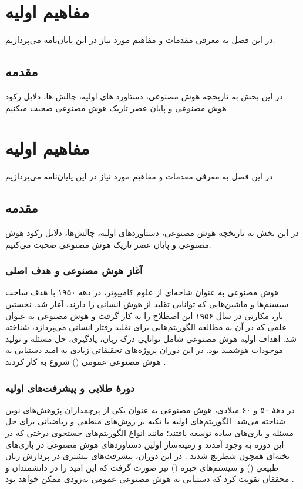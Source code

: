 \chapter{مفاهیم اولیه}
در این فصل به معرفی مقدمات و مفاهیم مورد نیاز در این پایان‌نامه می‌پردازیم. 
\section{مقدمه}
در این بخش به تاریخچه هوش مصنوعی، دستاورد های اولیه، چالش ها، دلایل رکود هوش مصنوعی و پایان عصر تاریک هوش مصنوعی صحبت میکنیم 



\chapter{مفاهیم اولیه}

در این فصل به معرفی مقدمات و مفاهیم مورد نیاز در این پایان‌نامه می‌پردازیم.

\section{مقدمه}

در این بخش به تاریخچه هوش مصنوعی، دستاوردهای اولیه، چالش‌ها، دلایل رکود هوش مصنوعی و پایان عصر تاریک هوش مصنوعی صحبت می‌کنیم.

\subsection{آغاز هوش مصنوعی و هدف اصلی}

هوش مصنوعی به عنوان شاخه‌ای از علوم کامپیوتر، در دهه ۱۹۵۰ با هدف ساخت سیستم‌ها و ماشین‌هایی که توانایی تقلید از هوش انسانی را دارند، آغاز شد. نخستین بار، مکارتی در سال ۱۹۵۶ این اصطلاح را به کار گرفت \cite{mccarthy1956proposal} و هوش مصنوعی به عنوان علمی که در آن به مطالعه الگوریتم‌هایی برای تقلید رفتار انسانی می‌پردازد، شناخته شد. اهداف اولیه هوش مصنوعی شامل توانایی درک زبان، یادگیری، حل مسئله و تولید موجودات هوشمند بود. در این دوران پروژه‌های تحقیقاتی زیادی به امید دستیابی به هوش مصنوعی عمومی 
()
شروع به کار کردند \cite{crevier1993ai,nilsson2010quest}.

\subsection{دورهٔ طلایی و پیشرفت‌های اولیه}

در دههٔ ۵۰ و ۶۰ میلادی، هوش مصنوعی به عنوان یکی از پرچمداران پژوهش‌های نوین شناخته می‌شد. الگوریتم‌های اولیه با تکیه بر روش‌های منطقی و ریاضیاتی برای حل مسئله و بازی‌های ساده توسعه یافتند؛ مانند انواع الگوریتم‌های جستجوی درختی که در این دوره به وجود آمدند و زمینه‌ساز اولین دستاوردهای هوش مصنوعی در بازی‌های تخته‌ای همچون شطرنج شدند \cite{newell1959report}. در این دوران، پیشرفت‌های بیشتری در پردازش زبان طبیعی () و سیستم‌های خبره () نیز صورت گرفت که این امید را در دانشمندان و محققان تقویت کرد که دستیابی به هوش مصنوعی عمومی به‌زودی ممکن خواهد بود \cite{feigenbaum1983handbook}.

